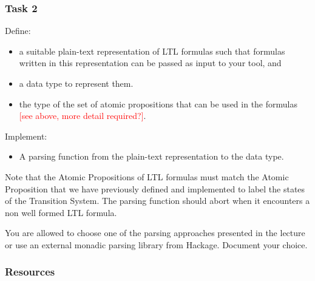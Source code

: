 \documentclass{article}
\begin{document}
\subsubsection*{Task 2}
Define:
\begin{itemize}
    \item a suitable plain-text representation of LTL formulas such that formulas written in this representation can be passed as input to your tool, and
    \item a data type to represent them. 
    \item the type of the set of atomic propositions that can be used in the formulas \textcolor{red}{[see above, more detail required?]}.
\end{itemize}
Implement: 
\begin{itemize}
    \item A parsing function from the plain-text representation to the data type.
\end{itemize}
Note that the Atomic Propositions of LTL formulas must match the Atomic Proposition that we have previously 
defined and implemented to label the states of the Transition System. The parsing function should abort 
when it encounters a non well formed LTL formula.

You are allowed to choose one of the parsing approaches presented in the lecture or 
use an external monadic parsing library from Hackage. Document your choice.

\subsubsection*{Resources}
\cite[Paragraph 5.1 (in particular 5.1.1 and 5.1.2)]{BaKa}
\end{document}
